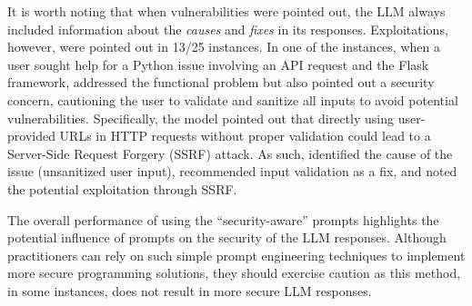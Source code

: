It is worth noting that when vulnerabilities were pointed out, the LLM always included information about the \textit{causes} and \textit{fixes} in its responses. Exploitations, however, were pointed out in 13/25 instances. In one of the instances, when a user sought help for a Python issue involving an API request and the Flask framework, \gpt addressed the functional problem but also pointed out a security concern, cautioning the user to validate and sanitize all inputs to avoid potential vulnerabilities. Specifically, the model pointed out that directly using user-provided URLs in HTTP requests without proper validation could lead to a Server-Side Request Forgery (SSRF) attack. As such, \gpt identified the cause of the issue (unsanitized user input), recommended input validation as a fix, and noted the potential exploitation through SSRF.%

The overall performance of \gpt using the ``security-aware'' prompts highlights the potential influence of prompts on the security of the LLM responses. Although practitioners can rely on such simple prompt engineering techniques to implement more secure programming solutions, they should exercise caution as this method, in some instances, does not result in more secure LLM responses.





